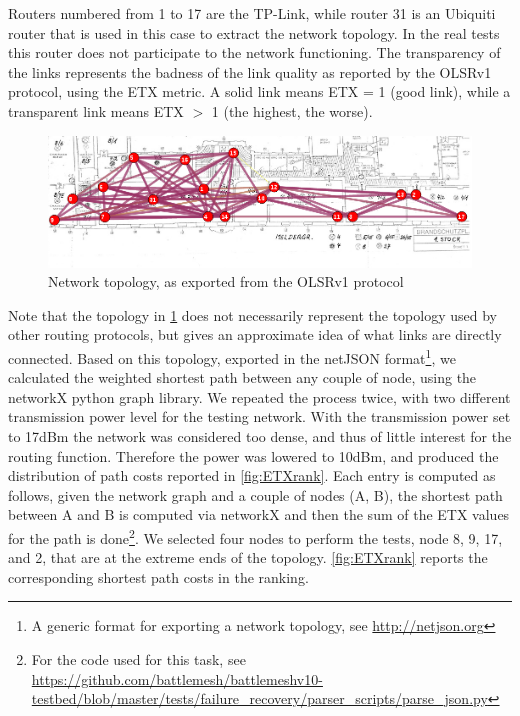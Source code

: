 \documentclass[10pt,onecolumn]{paper}
\begin{document}
Routers numbered from 1 to 17 are the TP-Link, while router 31 is an Ubiquiti
router that is used in this case to extract the network topology. In the real
tests this router does not participate to the network functioning. The
transparency of the links represents the badness of the link quality as reported
by the OLSRv1 protocol, using the ETX metric. A solid link means ETX =
1 (good link), while a transparent link means ETX $>$ 1 (the highest, the worse).


\begin{figure}[!htb]
  \centering
  \includegraphics[width=\linewidth]{images/map.png}
  \caption{Network topology, as exported from the OLSRv1 protocol} 
  \label{fig:topo}
\end{figure}%

Note that the topology in \cref{fig:topo} does not necessarily represent the
topology used by other routing protocols, but gives an approximate idea of what
links are directly connected. Based on this topology, exported in the netJSON
format\footnote{A generic format for exporting a network topology, see
\url{http://netjson.org}}, we calculated the weighted shortest path between any couple of node,
using the networkX python graph
library. We repeated the process twice, with two different transmission power
level for the testing network. With the transmission power set to 17dBm the
network was considered too dense, and thus of little interest for the routing
function. Therefore the power was lowered to 10dBm, and produced the
distribution of path costs reported in \cref{fig:ETXrank}. Each entry is computed
as follows, given the network graph and a couple of nodes (A, B), the shortest
path between A and B is computed via networkX and then the sum of the ETX values
for the path is done\footnote{For the code used for this task, see
\url{https://github.com/battlemesh/battlemeshv10-testbed/blob/master/tests/failure_recovery/parser_scripts/parse_json.py}}. We selected four nodes
to perform the tests, node 8, 9, 17, and 2, that are at the extreme ends of the
topology. \cref{fig:ETXrank} reports the corresponding shortest path costs in
the ranking.
\end{document}
